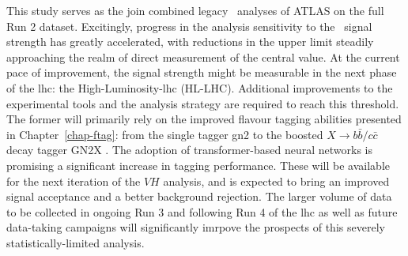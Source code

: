 This study serves as the join combined legacy \vhbc\ analyses of ATLAS on the full Run 2 dataset. Excitingly, progress in the analysis sensitivity to the \vhc\ signal strength has greatly accelerated, with reductions in the upper limit steadily approaching the realm of direct measurement of the central value. At the current pace of improvement, the signal strength might be measurable in the next phase of the \gls{lhc}: the High-Luminosity-\gls{lhc} (HL-LHC). Additional improvements to the experimental tools and the analysis strategy are required to reach this threshold. The former will primarily rely on the improved flavour tagging abilities presented in Chapter~\ref{chap-ftag}: from the single tagger \gls{gn2} to the boosted $X \rightarrow b\bar{b} / c\bar{c}$ decay tagger GN2X \cite{ATL-PHYS-PUB-2023-021}. The adoption of transformer-based neural networks is promising a significant increase in tagging performance. These will be available for the next iteration of the $VH$ analysis, and is expected to bring an improved signal acceptance and a better background rejection. The larger volume of data to be collected in ongoing Run 3 and following Run 4 of the \gls{lhc} as well as future data-taking campaigns will significantly imrpove the prospects of this severely statistically-limited analysis. 